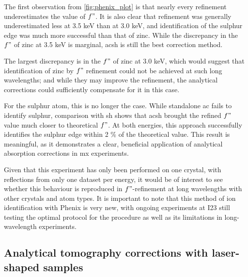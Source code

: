 The first observation from \cref{fig:phenix_plot} is that nearly every refinement underestimates the value of $f"$. It is also clear that refinement was generally underestimated less at 3.5 \unit{keV} than at 3.0 \unit{keV}, and identification of the sulphur edge was much more successful than that of zinc. While the discrepancy in the $f"$ of zinc at 3.5 \unit{keV} is marginal, \ac{acsh} is still the best correction method.

The largest discrepancy is in the $f"$ of zinc at 3.0 \unit{keV}, which would suggest that identification of zinc by $f"$ refinement could not be achieved at such long wavelengths; and while they may improve the refinement, the analytical corrections could sufficiently compensate for it in this case. %

For the sulphur atom, this is no longer the case. While standalone \ac{ac} fails to identify sulphur, comparison with \ac{sh} shows that \ac{acsh} brought the refined $f"$ value much closer to theoretical $f"$. At both energies, this approach successfully identifies the sulphur edge within 2 \% of the theoretical value. This result is meaningful, as it demonstrates a clear, beneficial application of analytical absorption corrections in \ac{mx} experiments.%

Given that this experiment has only been performed on one crystal, with reflections from only one dataset per energy, it would be of interest to see whether this behaviour is reproduced in $f"$-refinement at long wavelengths with other crystals and atom types. %
It is important to note that this method of ion identification with Phenix is very new, with ongoing experiments at I23 still testing the optimal protocol for the procedure as well as its limitations in long-wavelength experiments.

\subsection{Analytical tomography corrections with laser-shaped samples}

